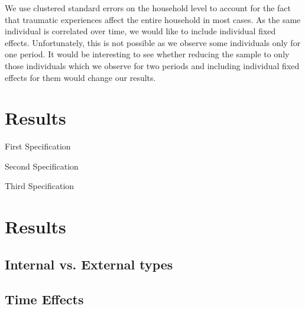 \documentclass[12pt, a4paper, fleqn, parskip]{scrartcl}
\begin{document}

We use clustered standard errors on the household level to account for the fact
that traumatic experiences affect the entire household in most cases. As the
same individual is correlated over time, we would like to include individual
fixed effects. Unfortunately, this is not possible as we observe some
individuals only for one period. It would be interesting to see whether
reducing the sample to only those individuals which we observe for two periods
and including individual fixed effects for them would change our results.


\section{Results}

\begin{table}
	\tiny{}
	\caption{First Specification}
	\label{tab:first_reg}
\end{table}
\newpage


\begin{table}
	\tiny{}
	\caption{Second Specification}
	\label{tab:second_reg}
\end{table}
\newpage

\begin{table}
	
	\caption{Third Specification}
	\label{tab:third_reg}
\end{table}
\newpage

\section{Results} %
\label{sec:results}

\subsection{Internal vs. External types} %
\label{sub:internal_vs_external_types}


\subsection{Time Effects} %
\label{sub:time_effects}
\end{document}
